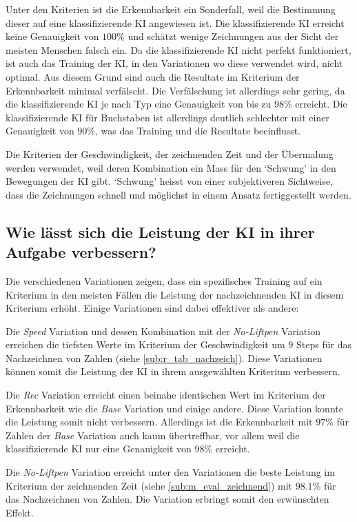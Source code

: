 Unter den Kriterien ist die Erkennbarkeit ein Sonderfall, weil die Bestimmung
dieser auf eine klassifizierende KI angewiesen ist. Die klassifizierende KI
erreicht keine Genauigkeit von $100\%$ und schätzt wenige Zeichnungen aus der
Sicht der meisten Menschen falsch ein. Da die klassifizierende KI nicht perfekt
funktioniert, ist auch das Training der KI, in den Variationen wo diese
verwendet wird, nicht optimal. Aus diesem Grund sind auch die Resultate im
Kriterium der Erkennbarkeit minimal verfälscht. Die Verfälschung ist allerdings
sehr gering, da die klassifizierende KI je nach Typ eine Genauigkeit von bis zu
$98\%$ erreicht. Die klassifizierende KI für Buchstaben ist allerdings deutlich
schlechter mit einer Genauigkeit von $90\%$, was das Training und die Resultate
beeinflusst.

Die Kriterien der Geschwindigkeit, der zeichnenden Zeit und der Übermalung
werden verwendet, weil deren Kombination ein Mass für den `Schwung' in den
Bewegungen der KI gibt. `Schwung' heisst von einer subjektiveren Sichtweise, dass
die Zeichnungen schnell und möglichst in einem Ansatz fertiggestellt werden.



\subsection{Wie lässt sich die Leistung der KI in ihrer Aufgabe verbessern?}\label{subsub:d_frage_unter_3}
Die verschiedenen Variationen zeigen, dass ein spezifisches Training auf ein
Kriterium in den meisten Fällen die Leistung der nachzeichnenden KI in diesem
Kriterium erhöht. Einige Variationen sind dabei effektiver als andere:

Die \emph{Speed} Variation und dessen Kombination mit der \emph{No-Liftpen}
Variation erreichen die tiefsten Werte im Kriterium der Geschwindigkeit um $9$
Steps für das Nachzeichnen von Zahlen (siehe \ref{sub:r_tab_nachzeich}).
Diese Variationen können somit die Leistung der KI in ihrem ausgewählten
Kriterium verbessern.

Die \emph{Rec} Variation erreicht einen beinahe identischen Wert im Kriterium
der Erkennbarkeit wie die \emph{Base} Variation und einige andere. Diese
Variation konnte die Leistung somit nicht verbessern. Allerdings ist die
Erkennbarkeit mit $97\%$ für Zahlen der \emph{Base} Variation auch kaum
übertreffbar, vor allem weil die klassifizierende KI nur eine Genauigkeit von
$98\%$ erreicht.

Die \emph{No-Liftpen} Variation erreicht unter den Variationen die beste
Leistung im Kriterium der zeichnenden Zeit (siehe
\ref{sub:m_eval_zeichnend}) mit $98.1\%$ für das Nachzeichnen von Zahlen.
Die Variation erbringt somit den erwünschten Effekt.


